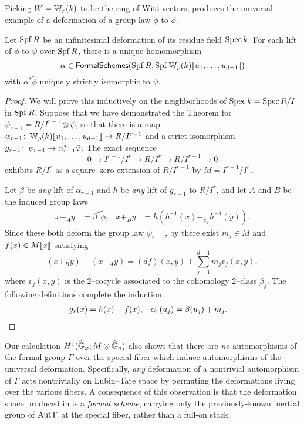 Picking $W = \mathbb W_p(k)$ to be the ring of Witt vectors,  produces the universal example of a deformation of a group law $\phi$ to $\tilde \phi$.

\begin{theorem}\label{LubinTateDeformationSpace}
Let $\operatorname{Spf} R$ be an infinitesimal deformation of its residue field $\operatorname{Spec} k$.  For each lift of $\phi$ to $\psi$ over $\operatorname{Spf} R$, there is a unique homomorphism \[\alpha \in \mathsf{FormalSchemes}(\operatorname{Spf} R, \operatorname{Spf} \mathbb W_p(k)\llbracket{u_1, \ldots, u_{d-1}}\rrbracket)\] with $\alpha^* \tilde \phi$ uniquely strictly isomorphic to $\psi$.
\end{theorem}
\begin{proof}
We will prove this inductively on the neighborhoods of $\operatorname{Spec} k = \operatorname{Spec} R / I$ in $\operatorname{Spf} R$.  Suppose that we have demonstrated the Theorem for $\psi_{r-1} = R / I^{r-1} \otimes \psi$, so that there is a map $\alpha_{r-1}\colon\thinspace \mathbb W_p(k)\llbracket{u_1, \ldots, u_{d-1}}\rrbracket \to R/I^{r-1}$ and a strict isomorphism $g_{r-1}\colon\thinspace \psi_{r-1} \to \alpha_{r-1}^* \tilde {\varphi}$.  The exact sequence \[0 \to I^{r-1} / I^r \to R/I^r \to R/I^{r-1} \to 0\] exhibits $R/I^r$ as a square--zero extension of $R/I^{r-1}$ by $M = I^{r-1} / I^r$.

Let $\beta$ be \emph{any} lift of $\alpha_{r-1}$ and $h$ be \emph{any} lift of $g_{r-1}$ to $R/I^r$, and let $A$ and $B$ be the induced group laws
\begin{align*}
x +_A y & = \beta^* \tilde \phi, &
x +_B y & = h\left( h^{-1}(x) +_{\psi_r} h^{-1}(y) \right).
\end{align*}
Since these both deform the group law $\psi_{r-1}$, by  there exist $m_j \in M$ and $f(x) \in M\llbracket{x}\rrbracket$ satisfying \[(x +_B y) - (x +_A y) = (df)(x, y) + \sum_{j=1}^{d-1} m_j v_j(x, y),\] where $v_j(x, y)$ is the $2$--cocycle associated to the cohomology $2$--class $\beta_j$.  The following definitions complete the induction:
\begin{align*}
g_r(x) & = h(x) - f(x), &
\alpha_r(u_j) & = \beta(u_j) + m_j. \qedhere
\end{align*}
\end{proof}

\begin{remark}\label{ActionBySnLiftsToLTn}
Our calculation $H^1(\widehat{\mathbb G}_\varphi; M \otimes \widehat{\mathbb G}_a)$ also shows that there are \emph{no} automorphisms of the formal group $\Gamma$ over the special fiber which induce automorphisms of the universal deformation.  Specifically, \emph{any} deformation of a nontrivial automorphism of $\Gamma$ acts nontrivially on Lubin--Tate space by permuting the deformations living over the various fibers.  A consequence of this observation is that the deformation space produced in  is a \emph{formal scheme}, carrying only the previously-known inertial group of $\operatorname{Aut} \Gamma$ at the special fiber, rather than a full-on stack.
\end{remark}

